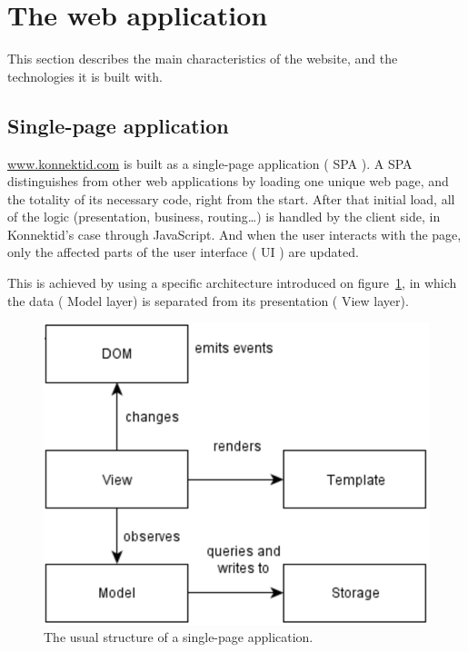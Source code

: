 \section{The web application}
\label{sec:website}

This section describes the main characteristics of the website, and the technologies it is built with.

\subsection{Single-page application}
\label{ssec:spa}

\url{www.konnektid.com} is built as a single-page application (\guillemotleft{} SPA \guillemotright{}).
A SPA distinguishes from other web applications by loading one unique web page, and the totality of its necessary code, right from the start.
After that initial load, all of the logic (presentation, business, routing\ldots) is handled by the client side, in Konnektid's case through JavaScript.
And when the user interacts with the page, only the affected parts of the user interface (\guillemotleft{} UI \guillemotright{}) are updated.

This is achieved by using a specific architecture introduced on {\sc figure}~\ref{fig:spaArchi}, in which the data (\guillemotleft{} Model
\guillemotright{} layer) is separated from its presentation (\guillemotleft{} View \guillemotright{} layer)\cite{spa}.

\begin{figure}[H]
    \centering
    \includegraphics[scale=0.5]{figure/spaArchi.png}
    \caption{The usual structure of a single-page application.}
    \label{fig:spaArchi}
\end{figure}

